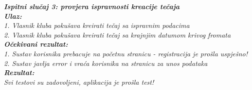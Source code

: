 			  \textbf{\textit{Ispitni slučaj 3: provjera ispravnosti kreacije tečaja}}\\
             \textbf{\textit{Ulaz:}}\\
              \textit{1. Vlasnik kluba pokušava kreirati tečaj sa ispravnim podacima}\\
              \textit{2. Vlasnik kluba pokušava kreirati tečaj sa krajnjim datumom krivog fromata}\\
 
              \textbf{\textit{Očekivani rezultat:}}\\
              \textit{1. Sustav korisnika prebacuje na početnu stranicu - registracija je prošla uspješno!}\\
              \textit{2. Sustav javlja error i vraća korisnika na stranicu za unos podataka}\\
 
              \textbf{\textit{Rezultat:}}\\
              \textit{Svi testovi su zadovoljeni, aplikacija je prošla test!}\\

